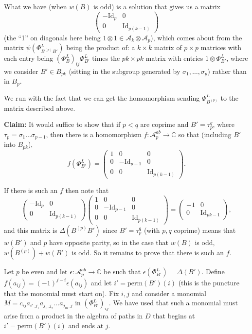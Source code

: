 \documentclass[11pt]{amsart}
\def\C{{\mathbb C}}
\def\A{{\mathcal A}}
\begin{document}
{\color{red} What we have (when $w(B)$ is odd) is a solution that gives us a matrix
  \[\begin{pmatrix}-\text{Id}_p & 0 \\ 0 & \text{Id}_{p(k-1)}\end{pmatrix}\]
  (the ``1'' on diagonals here being $1\otimes 1\in \A_k\otimes \A_p$), which comes about from the matrix $\psi(\Phi_{B^{(p)}B'}^L)$ being the product of: a $k\times k$ matrix of $p\times p$ matrices with each entry being $(\Phi_{B}^L)_{ij}\Phi_{B'}^L$ times the $pk \times pk$ matrix with entries $1\otimes \Phi_{B'}^L$, where we consider $B'\in B_{pk}$ (sitting in the subgroup generated by $\sigma_1,\ldots,\sigma_p$) rather than in $B_p$.

  }

We run with the fact that we can get the homomorphism sending $\Phi_{B^{(p)}}^L$ to the matrix described above.

{\bf Claim:} It would suffice to show that if $p<q$ are coprime and $B' = \tau_p^q$, where $\tau_p = \sigma_1\ldots\sigma_{p-1}$, then there is a homomorphism $f:\A_{p}^{ab}\to\C$ so that (including $B'$ into $B_{pk}$),
    \[f\left(\Phi_{B'}^L\right) = \begin{pmatrix}1 & 0 & 0\\ 0 & -\text{Id}_{p-1} & 0\\ 0 & 0 & \text{Id}_{p(k-1)}\end{pmatrix}.\]

If there is such an $f$ then note that
  \[\begin{pmatrix}-\text{Id}_p & 0 \\ 0 & \text{Id}_{p(k-1)}\end{pmatrix}\begin{pmatrix}1 & 0 & 0\\ 0 & -\text{Id}_{p-1} & 0\\ 0 & 0 & \text{Id}_{p(k-1)}\end{pmatrix} =
  \begin{pmatrix}-1 & 0\\ 0 & \text{Id}_{pk-1}\end{pmatrix},\]
  and this matrix is $\Delta(B^{(p)}B')$ since $B'=\tau_p^q$ (with $p,q$ coprime) means that $w(B')$ and $p$ have opposite parity, so in the case that $w(B)$ is odd, $w(B^{(p)})+w(B')$ is odd. So it remains to prove that there is such an $f$.

  Let $p$ be even and let $\epsilon:\A_{p}^{ab}\to\C$ be such that $\epsilon(\Phi_{B'}^L) = \Delta(B')$. Define $f(a_{ij}) = (-1)^{j-i}\epsilon(a_{ij})$ and let $i'=\text{perm}(B')(i)$ (this is the puncture that the monomial must start on). Fix $i,j$ and consider a monomial $M=c_{ij}a_{i',j_1}a_{j_1,j_2}\ldots a_{j_m,j}$ in $\left(\Phi_{B'}^L\right)_{ij}$. We have used that such a monomial must arise from a product in the algebra of paths in $D$ that begins at $i'=\text{perm}(B')(i)$ and ends at $j$. 
\end{document}
